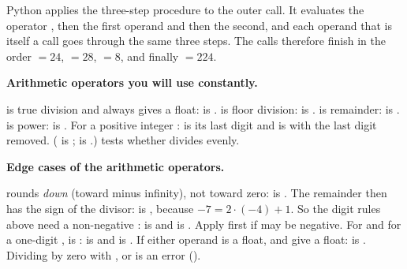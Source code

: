 \documentclass[10pt]{scrartcl}
\begin{document}
\begin{fig}
\end{fig}

\revisit Python applies the three-step procedure to the outer call. It evaluates the operator , then the first operand and then the second, and each operand that is itself a call goes through the same three steps. The calls therefore finish in the order  $= 24$,  $= 28$,  $= 8$, and finally  $= 224$.

\textbf{Arithmetic operators you will use constantly.}
\begin{itemize}
  \ii \cd{/} is true division and always gives a float:  is . \cd{//} is floor division:  is . \cd{\%} is remainder:  is . \cd{**} is power:  is .
  \ii For a positive integer :  is its last digit and  is  with the last digit removed. ( is ;  is .)
  \ii {} tests whether  divides  evenly.
\end{itemize}

\textbf{Edge cases of the arithmetic operators.}
\begin{itemize}
  \ii \cd{//} rounds \emph{down} (toward minus infinity), not toward zero:  is . The remainder then has the sign of the divisor:  is , because $-7 = 2 \cdot (-4) + 1$.
  \ii So the digit rules above need a non-negative :  is  and  is . Apply  first if  may be negative.
  \ii For  and for a one-digit ,  is :  is  and  is .
  \ii If either operand is a float, \cd{//} and \cd{\%} give a float:  is .
  \ii Dividing by zero with \cd{/}, \cd{//} or \cd{\%} is an error ().
\end{itemize}
\end{document}
